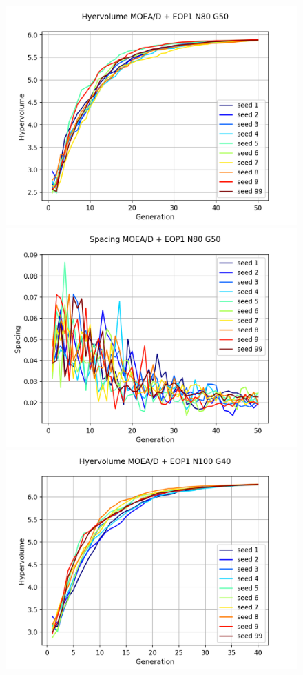 \begin{figure}[H]
\centering
\includegraphics[scale=0.43]{figures/METRICS_EOP1/Hypervol_N80_G50.png}\quad 
\includegraphics[scale=0.43]{figures/METRICS_EOP1/Spacing_N80_G50.png}\\
\includegraphics[scale=0.43]{figures/METRICS_EOP1/Hypervol_N100_G40.png}\quad 

\end{figure}
